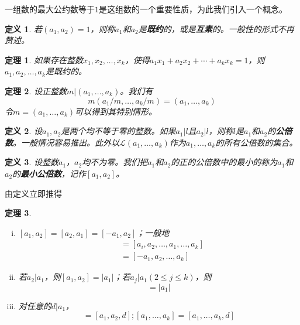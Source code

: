 \documentclass{ctexrep}
\newcommand{\bbold}[1]{\textbf{#1}}
\newcommand{\aabs}[1]{{ \left| #1 \right| }}
\newtheorem{thrm}{定理}[section]
\newtheorem{defn}{定义}[section]
\begin{document}
一组数的最大公约数等于$1$是这组数的一个重要性质，为此我们引入一个概念。

\begin{defn}
若$(a_1,a_2)=1$，则称$a_1$和$a_2$是\bbold{既约}的，或是\bbold{互素}的。一般性的形式不再赘述。
\end{defn}

\begin{thrm}
如果存在整数$x_1,x_2,\dotsc,x_k$，使得$a_1 x_1 +a_2 x_2 + \dotsb + a_k x_k =1$，则$a_1, a_2, \dotsc, a_k$是既约的。
\end{thrm}

\begin{thrm}\label{THRM:gcd}
设正整数$m|(a_1,\dotsc,a_k)$。我们有
\begin{equation}
m(a_1/m,\dotsc,a_k/m)=(a_1,\dotsc,a_k)
\end{equation}
令$m=(a_1,\dotsc,a_k)$可以得到其特别情形。
\end{thrm}

\begin{defn}
设$a_1,a_2$是两个均不等于零的整数。如果$a_1|l$且$a_2|l$，则称$l$是$a_1$和$a_2$的\bbold{公倍数}。一般情况容易推出。此外以$\mathscr{L}(a_1,\dotsc,a_k)$作为$a_1,\dotsc,a_k$的所有公倍数的集合。
\end{defn}

\begin{defn}
设整数$a_1$，$a_2$均不为零。我们把$a_1$和$a_2$的正的公倍数中的最小的称为$a_1$和$a_2$的\bbold{最小公倍数}，记作$[a_1,a_2]$。
\end{defn}

由定义立即推得
\begin{thrm}
\begin{enumerate}[(i)]
\item $[a_1,a_2]=[a_2,a_1]=[-a_1,a_2]$；一般地
\begin{align}
[a_1,a_2,\dotsc,a_i,\dotsc,a_k]&=[a_i,a_2,\dotsc,a_1,\dotsc,a_k]\nonumber\\
                               &=[-a_1,a_2,\dotsc,a_k]\nonumber
\end{align}
\item 若$a_2|a_1$，则$[a_1,a_2]=\aabs{a_1}$；若$a_j|a_1(2 \leq j \leq k)$，则
\begin{displaymath}
[a_1,\dotsc,a_k]=\aabs{a_1}
\end{displaymath}
\item 对任意的$d|a_1$，
\begin{displaymath}
[a_1,a_2]=[a_1,a_2,d]; [a_1,\dotsc,a_k]=[a_1,\dotsc,a_k,d]
\end{displaymath}
\end{enumerate}
\end{thrm}
\end{document}
